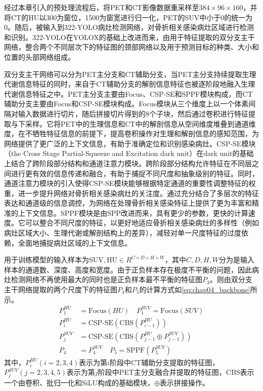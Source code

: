 经过本章引入的预处理流程后，将PET和CT影像数据重采样至\(384 \times 96\times 160\)，并将CT的HU以300为窗位，1500为窗宽进行归一化，PET的SUV中小于0的统一为0。随后，被输入到322-YOLO病灶检测网络，对骨折相关感染病灶区域进行检测和识别。322-YOLO在YOLOX\cite{ge2021yolox}的基础上改进而来，由用于特征提取的双分支主干网络，整合两个不同层次下的特征图的颈部网络以及用于预测目标的种类、大小和位置的头部网络组成。

双分支主干网络可以分为PET主分支和CT辅助分支，当PET主分支持续提取生理代谢信息特征的同时，来自于CT辅助分支的解剖信息特征也被逐阶段地融入生理代谢信息特征之中。PET主分支主要由Focus、CSP-SE和SPPF模块构成，而CT辅助分支主要由Focus和CSP-SE模块构成。Focus模块从三个维度上以一个体素间隔对输入数据进行切片，随后拼接切片得到的8个子块，然后通过卷积进行特征提取与下采样。它将PET中的生理信息和CT中的解剖信息从空间维度堆叠到通道维度，在不牺牲特征信息的前提下，提高卷积操作对生理和解剖信息的感知范围，为网络提供了更广泛的上下文信息，有助于准确定位和识别感染病灶。CSP-SE模块（the Cross Stage Partial-Squeeze and Excitation dark unit）在dark unit的基础上结合了跨阶段部分结构\cite{wang2020cspnet}和通道注意力模块\cite{hu2018squeeze}。跨阶段部分结构允许特征在不同层之间进行更有效的信息传递和融合，有助于捕捉不同尺度和抽象级别的特征。同时，通道注意力模块的引入使得CSP-SE模块能够根据特定通道的重要性调整特征的权重，进一步提升网络对骨折相关感染病灶的关注度。通过充分结合了多层次的特征表达和通道级的信息调控，为网络在处理骨折相关感染特征上提供了更为丰富和精准的上下文信息。SPPF模块是由SPP\cite{he2015spatial}改进而来，具有更少的参数，更快的计算速度。它可以整合不同尺度的特征，以更好地适应骨折相关感染病灶的多样性（例如病灶区域大小、生理代谢或解剖结构上的差异），减轻对单一尺度特征的过度依赖，全面地捕捉病灶区域的上下文信息。

用于训练模型的输入样本为\(\text{SUV}, \text{HU} \in R^{C \times D \times H \times W}\)，其中\(C,D,H,W\)分为是输入样本的通道数、深度、高度和宽度。由于正负样本存在极度不平衡的问题，因此病灶检测网络不再使用最大的同时也是正负样本最不平衡的特征图\(P_3\)。则由双分支主干网络提取的两个尺度下的特征图\(P_4\)和\(P_5\)的计算方式如\ref{eq:chap04_backbone}所示。
\begin{equation}
  \begin{aligned}
    P_1^{HU}  & = \text{Focus}(HU) \quad P_1^{SUV} = \text{Focus}(SUV)         \\
    P_i^{HU}  & = \text{CSP-SE}(\text{CBS}(P^{HU}_{i-1}))                      \\
    P_j^{SUV} & = \text{CSP-SE}(\text{CBS}(P^{HU}_{j-1} \oplus P^{SUV}_{j-1})) \\
    P_4       & = P_4^{SUV} \quad P_5 = \text{SPPF}(P_5^{SUV})
  \end{aligned}
  \label{eq:chap04_backbone}
\end{equation}
其中，\(P_i^{HU}(i=2,3,4)\)表示为第\(i\)阶段中CT辅助分支提取的特征图，\(P_j^{SUV}(j=2,3,4,5)\)表示为第\(j\)阶段中PET主分支融合并提取的特征图，CBS表示一个由卷积、批归一化和SiLU构成的基础模块，\(\oplus\)表示拼接操作。


